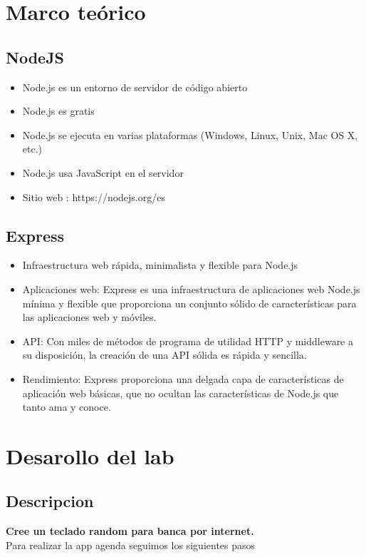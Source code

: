 \documentclass{article}
\begin{document}
\maketitle


\section{Marco teórico}

\subsection{NodeJS}

\begin{itemize}
    \item Node.js es un entorno de servidor de código abierto
    \item Node.js es gratis
    \item Node.js se ejecuta en varias plataformas (Windows, Linux, Unix, Mac OS X, etc.)
    \item Node.js usa JavaScript en el servidor
    \item Sitio web : https://nodejs.org/es
\end{itemize}

\subsection{Express}

\begin{itemize}
    \item Infraestructura web rápida, minimalista y flexible para Node.js
    \item Aplicaciones web: Express es una infraestructura de aplicaciones web Node.js mínima y flexible que proporciona un conjunto sólido de características para las aplicaciones web y móviles.
    \item API: Con miles de métodos de programa de utilidad HTTP y middleware a su disposición, la creación de una API sólida es rápida y sencilla.
    \item Rendimiento: Express proporciona una delgada capa de características de aplicación web básicas, que no ocultan las características de Node.js que tanto ama y conoce.
\end{itemize}


\section{Desarollo del lab}
\subsection{Descripcion}
\textbf{Cree un teclado random para banca por internet. }
\\Para realizar la app agenda seguimos los siguientes pasos
\end{document}
